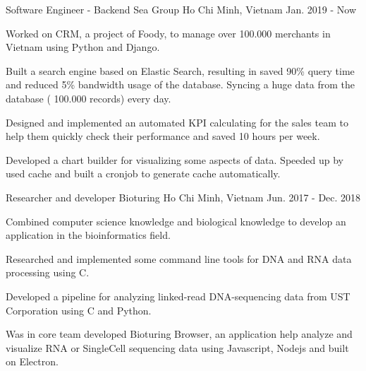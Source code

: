 

\begin{cventries}

  \cventry
    {Software Engineer - Backend} %
    {Sea Group} %
    {Ho Chi Minh, Vietnam} %
    {Jan. 2019 - Now} %
    {
      \begin{cvitems} %
        \item {Worked on CRM, a project of Foody, to manage over 100.000 merchants in Vietnam using Python and Django.}
        \item {Built a search engine based on Elastic Search, resulting in saved 90\% query time and reduced 5\% bandwidth usage of the database. Syncing a huge data from the database ( 100.000 records) every day.}
        \item {Designed and implemented an automated KPI calculating for the sales team to help them quickly check their performance and saved 10 hours per week.}
        \item {Developed a chart builder for visualizing some aspects of data. Speeded up by used cache and built a cronjob to generate cache automatically.}
      \end{cvitems}
    }

  \cventry
    {Researcher and developer} %
    {Bioturing} %
    {Ho Chi Minh, Vietnam} %
    {Jun. 2017 - Dec. 2018} %
    {
      \begin{cvitems} %
        \item {Combined computer science knowledge and biological knowledge to develop an application in the bioinformatics field.}
        \item {Researched and implemented some command line tools for DNA and RNA data processing using C.}
        \item {Developed a pipeline for analyzing linked-read DNA-sequencing data from UST Corporation using C and Python.}
        \item {Was in core team developed Bioturing Browser, an application help analyze and visualize RNA or SingleCell sequencing data using Javascript, Nodejs and built on Electron.}
      \end{cvitems}
    }


\end{cventries}
